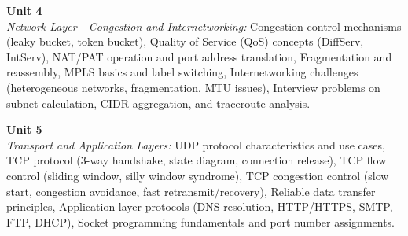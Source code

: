 \noindent\textbf{Unit 4} \\
\textit{Network Layer - Congestion and Internetworking:} Congestion control mechanisms (leaky bucket, token bucket), Quality of Service (QoS) concepts (DiffServ, IntServ), NAT/PAT operation and port address translation, Fragmentation and reassembly, MPLS basics and label switching, Internetworking challenges (heterogeneous networks, fragmentation, MTU issues), Interview problems on subnet calculation, CIDR aggregation, and traceroute analysis.

\vspace{0.3cm}

\noindent\textbf{Unit 5} \\
\textit{Transport and Application Layers:} UDP protocol characteristics and use cases, TCP protocol (3-way handshake, state diagram, connection release), TCP flow control (sliding window, silly window syndrome), TCP congestion control (slow start, congestion avoidance, fast retransmit/recovery), Reliable data transfer principles, Application layer protocols (DNS resolution, HTTP/HTTPS, SMTP, FTP, DHCP), Socket programming fundamentals and port number assignments.

\newpage
{}
